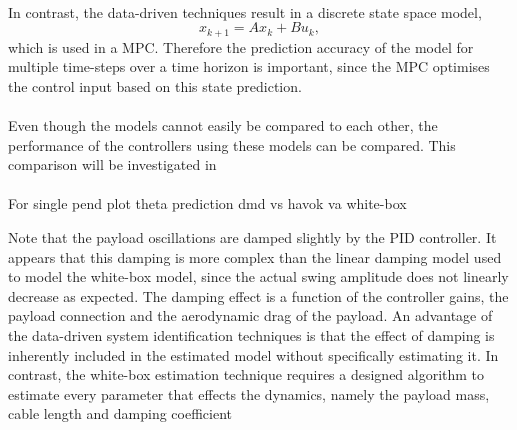         \paragraph{}
        In contrast, the data-driven techniques result in a discrete state space model,
        \begin{equation}
            x_{k+1} = A x_k + B u_k ,
        \end{equation} 
        which is used in a MPC.
        Therefore the prediction accuracy of the model for multiple time-steps over a time horizon is important,
        since the MPC optimises the control input based on this state prediction.
        
        \paragraph{}
        Even though the models cannot easily be compared to each other, 
        the performance of the controllers using these models can be compared.
        This comparison will be investigated in %

        \paragraph{}
        For single pend
        plot theta prediction dmd vs havok va white-box

        Note that the payload oscillations are damped slightly by the PID controller.
        It appears that this damping is more complex than the linear damping model 
        used to model the white-box model, since the actual swing amplitude 
        does not linearly decrease as expected.
        The damping effect is a function of the controller gains, 
        the payload connection and the aerodynamic drag of the payload.
        An advantage of the data-driven system identification techniques 
        is that the effect of damping is inherently included in the estimated model 
        without specifically estimating it.
        In contrast, the white-box estimation technique requires a designed algorithm 
        to estimate every parameter that effects the dynamics, 
        namely the payload mass, cable length and damping coefficient


        \paragraph{}
        
        
        
